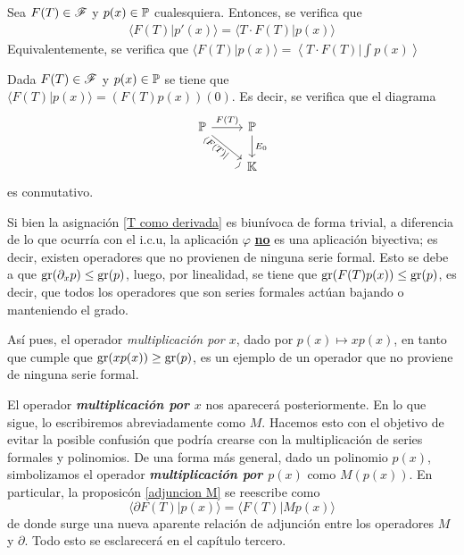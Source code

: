 \begin{corolario}
    Sea $F(T) \in \mathscr{F}$ y $p(x) \in \mathbb{P}$ cualesquiera. Entonces, se verifica que
        \begin{align*}
            \langle F(T) | p'(x)\rangle = \langle T\cdot F(T)| p(x)\rangle
       \end{align*}
    Equivalentemente, se verifica que $\langle F(T) | p(x)\rangle = \left\langle T\cdot F(T)| \int p(x) \right\rangle$
\end{corolario}

\begin{corolario}
    Dada $F(T) \in \mathscr{F}$ y $p(x) \in \mathbb{P}$ se tiene que $ \langle  F(T) | p(x) \rangle = (F(T)p(x))(0)$. Es decir, se verifica que el diagrama
\[
	\begin{tikzcd}
    {\poly} & {\poly}\\
    & {\field}
    \arrow["{F(T)}", from=1-1, to=1-2]
    \arrow["{\langle F(T) | \quad \rangle}"', sloped, above, from=1-1, to=2-2]
    \arrow["{E_0}", from=1-2, to=2-2]
    \end{tikzcd}
\]
es conmutativo.
\end{corolario}
Si bien la asignación \eqref{T como derivada} es biunívoca de forma trivial, a diferencia de lo que ocurría con el i.c.u, la aplicación $\varphi$ \underline{\textbf{no}} es una aplicación biyectiva; es decir, existen operadores que no provienen de ninguna serie formal. Esto se debe a que $\operatorname{gr}(\partial_{x} p) \leq \operatorname{gr}(p)$, luego, por linealidad, se tiene que $\operatorname{gr}(F(T)p(x)) \leq \operatorname{gr}(p)$, es decir, que todos los operadores que son series formales actúan bajando o manteniendo el grado.

Así pues, el operador \textit{multiplicación por $x$}, dado por $p(x) \mapsto xp(x)$, en tanto que cumple que $\operatorname{gr}(xp(x)) \geq \operatorname{gr}(p)$, es un ejemplo de un operador que no proviene de ninguna serie formal.

\begin{obs}\label{multiplicacion por x operador}
    El operador \textbf{\textit{multiplicación por $x$}} nos aparecerá posteriormente. En lo que sigue, lo escribiremos abreviadamente como $M$. Hacemos esto con el objetivo de evitar la posible confusión que podría crearse con la multiplicación de series formales y polinomios. De una forma más general, dado un polinomio $p(x)$, simbolizamos el operador \textit{\textbf{multiplicación por $p(x)$}} como $M(p(x))$. En particular, la proposicón \ref{adjuncion M} se reescribe como
    \begin{equation}\label{adjuncion multiplicar x}
        \langle \partial F(T) | p(x) \rangle = \langle F(T) | M p(x)\rangle
    \end{equation}
    de donde surge una nueva aparente relación de adjunción entre los operadores $M$ y $\partial$. Todo esto se esclarecerá en el capítulo tercero. 
\end{obs}

